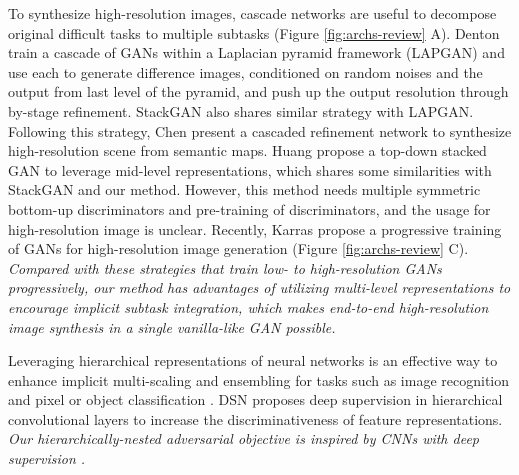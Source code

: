 \documentclass[10pt,twocolumn,letterpaper]{article}
\begin{document}
To synthesize high-resolution images, cascade networks are useful to decompose original difficult tasks to multiple subtasks (Figure \ref{fig:archs-review} A).
Denton \etal \cite{denton2015deep} train a cascade of GANs within a Laplacian pyramid framework (LAPGAN) and use each to generate difference images, conditioned on random noises and the output from last level of the pyramid, and push up the output resolution through by-stage refinement. StackGAN also shares similar strategy with LAPGAN. Following this strategy, Chen \etal \cite{chen2017photographic} present a cascaded refinement network to synthesize high-resolution scene from semantic maps. 
Huang \etal \cite{huang2016stacked}
propose a top-down stacked GAN to leverage mid-level representations, which shares some similarities with StackGAN and our method. However, this method needs multiple symmetric bottom-up discriminators and pre-training of discriminators, and the usage for high-resolution image is unclear. Recently, Karras \etal \cite{Karras2017progressive} propose a progressive training of GANs for high-resolution image generation (Figure \ref{fig:archs-review} C). \textit{Compared with these strategies that train low- to high-resolution GANs progressively, our method has advantages of utilizing multi-level representations to encourage implicit subtask integration, which makes end-to-end high-resolution image synthesis in a single vanilla-like GAN possible.}


Leveraging hierarchical representations of neural networks is an effective way to enhance implicit multi-scaling and ensembling for tasks such as image recognition \cite{lee2015deeply} and pixel or object classification \cite{xie2015holistically,cai2016unified,long2015fully}. DSN \cite{lee2015deeply} proposes deep supervision in hierarchical convolutional layers to increase the discriminativeness of feature representations. 
\textit{Our hierarchically-nested adversarial objective is inspired by CNNs with deep supervision \cite{lee2015deeply,xie2015holistically}. }

%
%
\end{document}

